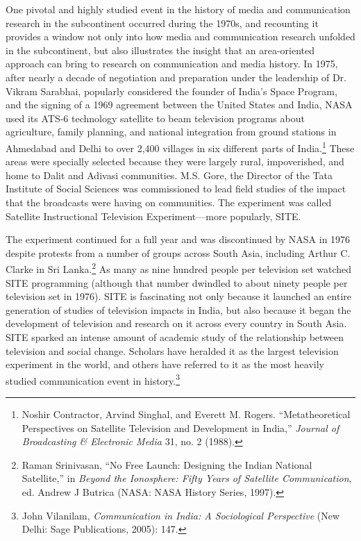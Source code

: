 \documentclass{tufte-handout}
\begin{document}
One pivotal and highly studied event in the history of media and
communication research in the subcontinent occurred during the 1970s,
and recounting it provides a window not only into how media and
communication research unfolded in the subcontinent, but also
illustrates the insight that an area-oriented approach can bring to
research on communication and media history. In 1975, after nearly a
decade of negotiation and preparation under the leadership of Dr. Vikram
Sarabhai, popularly considered the founder of India's Space Program, and
the signing of a 1969 agreement between the United States and India,
NASA used its ATS-6 technology satellite to beam television programs
about agriculture, family planning, and national integration from ground
stations in Ahmedabad and Delhi to over 2,400 villages in six different
parts of India.\footnote{Noshir Contractor, Arvind Singhal, and Everett
  M. Rogers. ``Metatheoretical Perspectives on Satellite Television and
  Development in India,'' \emph{Journal of Broadcasting \& Electronic
  Media} 31, no. 2 (1988).} These areas were specially selected because
they were largely rural, impoverished, and home to Dalit and Adivasi
communities. M.S. Gore, the Director of the Tata Institute of Social
Sciences was commissioned to lead field studies of the impact that the
broadcasts were having on communities. The experiment was called
Satellite Instructional Television Experiment---more popularly, SITE.

The experiment continued for a full year and was discontinued by NASA in
1976 despite protests from a number of groups across South Asia,
including Arthur C. Clarke in Sri Lanka.\footnote{Raman Srinivasan, ``No
  Free Launch: Designing the Indian National Satellite,'' in
  \emph{Beyond the Ionosphere: Fifty Years of Satellite Communication},
  ed. Andrew J Butrica (NASA: NASA History Series, 1997).} As many as
nine hundred people per television set watched SITE programming
(although that number dwindled to about ninety people per television set
in 1976). SITE is fascinating not only because it launched an entire
generation of studies of television impacts in India, but also because
it began the development of television and research on it across every
country in South Asia. SITE sparked an intense amount of academic study
of the relationship between television and social change. Scholars have
heralded it as the largest television experiment in the world, and
others have referred to it as the most heavily studied communication
event in history.\footnote{John Vilanilam, \emph{Communication in India:
  A Sociological Perspective} (New Delhi: Sage Publications, 2005): 147.}
\end{document}
